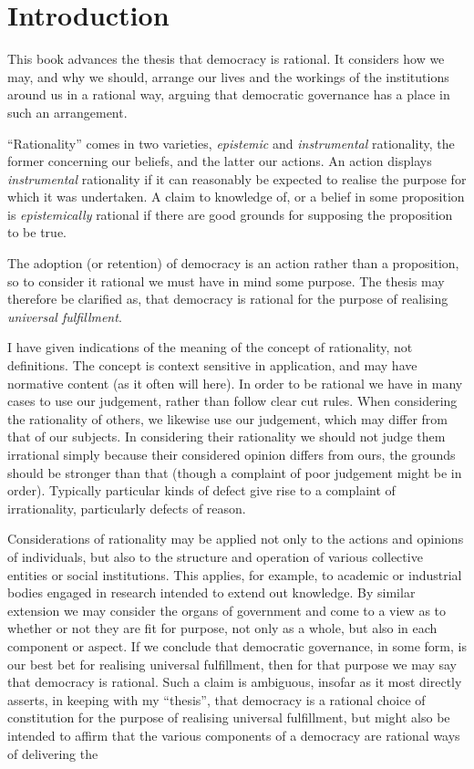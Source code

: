 \mainmatter
\chapter{Introduction}

This book advances the thesis that democracy is rational.
It considers how we may, and why we should, arrange our lives and the workings of the institutions around us in a rational way, arguing that democratic governance has a place in such an arrangement.

``Rationality'' comes in two varieties, \emph{epistemic} and \emph{instrumental} rationality, the former concerning our beliefs, and the latter our actions.
An action displays \emph{instrumental} rationality if it can reasonably be expected to realise the purpose for which it was undertaken.
A claim to knowledge of, or a belief in some proposition is \emph{epistemically} rational if there are good grounds for supposing the proposition to be true.

The adoption (or retention) of democracy is an action rather than a  proposition, so to consider it rational we must have in mind some purpose.
The thesis may therefore be clarified as, that democracy is rational for the purpose of realising \emph{universal fulfillment}.

I have given indications of the meaning of the concept of rationality, not definitions.
The concept is context sensitive in application, and may have normative content (as it often will here).
In order to be rational we have in many cases to use our judgement, rather than follow clear cut rules.
When considering the rationality of others, we likewise use our judgement, which may differ from that of our subjects.
In considering their rationality we should not judge them irrational simply because their considered opinion differs from ours, the grounds should be stronger than that (though a complaint of poor judgement might be in order).
Typically particular kinds of defect give rise to a complaint of irrationality, particularly defects of reason.

Considerations of rationality may be applied not only to the actions and opinions of individuals, but also to the structure and operation of various collective entities or social institutions.
This applies, for example, to academic or industrial bodies engaged in research intended to extend out knowledge.
By similar extension we may consider the organs of government and come to a view as to whether or not they are fit for purpose, not only as a whole, but also in each component or aspect.
If we conclude that democratic governance, in some form, is our best bet for realising universal fulfillment, then for that purpose we may say that democracy is rational.
Such a claim is ambiguous, insofar as it most directly asserts, in keeping with my ``thesis'', that democracy is a rational choice of constitution for the purpose of realising universal fulfillment, but might also be intended to affirm that the various components of a democracy are rational ways of delivering the 

